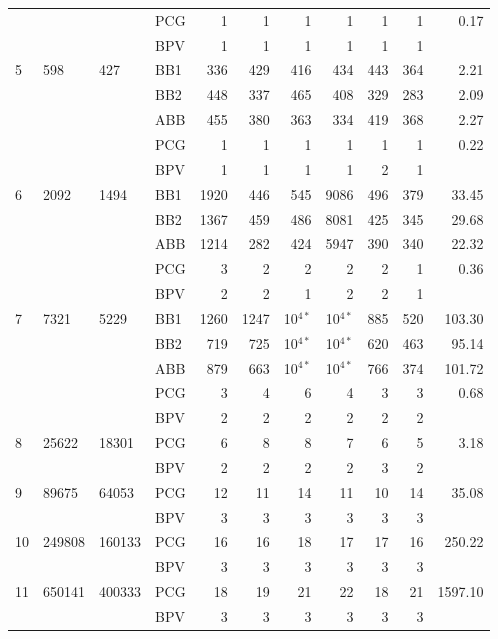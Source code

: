 \documentclass[11pt]{article}
\newcommand{\0}{\phantom{0}}
\begin{document}
\begin{table}[ht]
\begin{threeparttable}
\begin{tabular}{llllrrrrrrr}
			& & & PCG & 1 & 1 & 1 & 1 & 1 & 1 & 0.17 \\
			& & & BPV & 1 & 1 & 1 & 1 & 1 & 1 & \pmb{$0.09$} \\
			\midrule
			5 & 598 & 427 & BB1 & 336 & 429 & 416 & 434 & 443 & 364 & 2.21 \\
			& & & BB2 & 448 & 337 & 465 & 408 & 329 & 283 & 2.09 \\
			& & & ABB & 455 & 380 & 363 & 334 & 419 & 368 & 2.27 \\
			& & & PCG & 1 & 1 & 1 & 1 & 1 & 1 & 0.22 \\	
			& & & BPV & 1 & 1 & 1 & 1 & 2 & 1 & \pmb{$0.12$} \\ 
			\midrule		
			6 & 2092 & 1494 & BB1 & 1920 & 446 & 545 & 9086 & 496 & 379 & 33.45 \\
			& & & BB2 & 1367 & 459 & 486 & 8081 & 425 & 345 & 29.68 \\
			& & & ABB & 1214 & 282 & 424 & 5947 & 390 & 340 & 22.32 \\
			& & & PCG & 3 & 2 & 2 & 2 & 2 & 1 & 0.36 \\
			& & & BPV & 2 & 2 & 1 & 2 & 2 & 1 & \pmb{$0.17$} \\
			\midrule
			7 & 7321 & 5229 & BB1 & 1260 & 1247 & 10$^{4*}$ & 10$^{4*}$ & 885 & 520 & 103.30 \\
			& & & BB2 & 719 & 725 & 10$^{4*}$ & 10$^{4*}$ & 620 & 463 & 95.14 \\
			& & & ABB & 879 & 663 & 10$^{4*}$ & 10$^{4*}$ & 766 & 374 & 101.72 \\
			& & & PCG & 3 & 4 & 6 & 4 & 3 & 3 & 0.68 \\
			& & & BPV & 2 & 2 & 2 & 2 & 2 & 2 & \pmb{$0.57$} \\
			\midrule
			8 & 25622 & 18301 & PCG & 6 & 8 & 8 & 7 & 6 & 5 & 3.18 \\
			& & & BPV & 2 & 2 & 2 & 2 & 3 & 2 & \pmb{$1.76$} \\
			\midrule
			9 & 89675 & 64053 & PCG & 12 & 11 & 14 & 11 & 10 & 14 & 35.08 \\	
			& & & BPV & 3 & 3 & 3 & 3 & 3 & 3 & \pmb{$6.45$} \\	
			\midrule	
			10 & 249808 & 160133 & PCG & 16 & 16 & 18 & 17 & 17 & 16 & 250.22 \\
			& & & BPV & 3 & 3 & 3 & 3 & 3 & 3 & \pmb{$21.00$} \\
			\midrule
			11 & 650141 & 400333 & PCG & 18 & 19 & 21 & 22 & 18 & 21 & 1597.10 \\
			& & & BPV & 3 & 3 & 3 & 3 & 3 & 3 & \pmb{$56.84$} \\

\end{tabular}
\end{threeparttable}
\end{table}
\end{document}
